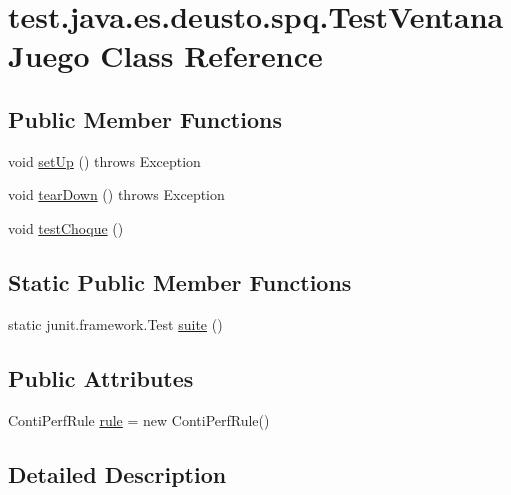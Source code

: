 \hypertarget{classtest_1_1java_1_1es_1_1deusto_1_1spq_1_1_test_ventana_juego}{}\section{test.\+java.\+es.\+deusto.\+spq.\+Test\+Ventana\+Juego Class Reference}
\label{classtest_1_1java_1_1es_1_1deusto_1_1spq_1_1_test_ventana_juego}
\subsection*{Public Member Functions}
\begin{DoxyCompactItemize}
\item 
void \hyperlink{classtest_1_1java_1_1es_1_1deusto_1_1spq_1_1_test_ventana_juego_a78c33408d874b69f96f848fb3c21e9a1}{set\+Up} ()  throws Exception 
\item 
void \hyperlink{classtest_1_1java_1_1es_1_1deusto_1_1spq_1_1_test_ventana_juego_a2fd86095b29fb71a00a9dbcd02608cf2}{tear\+Down} ()  throws Exception 
\item 
void \hyperlink{classtest_1_1java_1_1es_1_1deusto_1_1spq_1_1_test_ventana_juego_a02d5fd88aedf10c675ae38fba5d43663}{test\+Choque} ()
\end{DoxyCompactItemize}
\subsection*{Static Public Member Functions}
\begin{DoxyCompactItemize}
\item 
static junit.\+framework.\+Test \hyperlink{classtest_1_1java_1_1es_1_1deusto_1_1spq_1_1_test_ventana_juego_a3db606a48863443704b46a2149ec7469}{suite} ()
\end{DoxyCompactItemize}
\subsection*{Public Attributes}
\begin{DoxyCompactItemize}
\item 
Conti\+Perf\+Rule \hyperlink{classtest_1_1java_1_1es_1_1deusto_1_1spq_1_1_test_ventana_juego_a5ab79d2400e88b633e243e5a46e73400}{rule} = new Conti\+Perf\+Rule()
\end{DoxyCompactItemize}


\subsection{Detailed Description}


